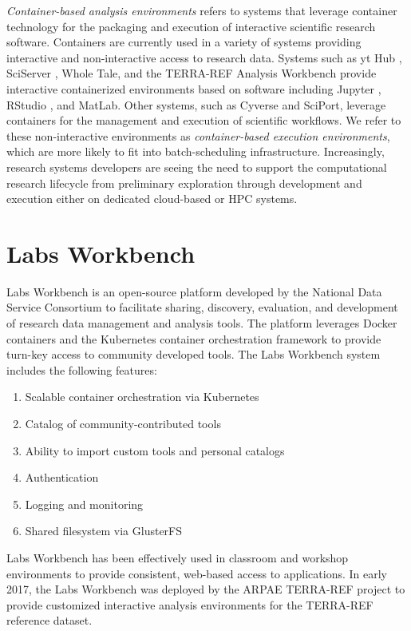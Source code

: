 \documentclass{sig-alternate}
\begin{document}
\emph{Container-based analysis environments} refers to systems that leverage container technology for the packaging and execution of interactive scientific research software. Containers are currently used in a variety of systems providing interactive and non-interactive access to research data. Systems such as yt Hub \cite{smith2011}, SciServer \cite{Medvedev:2016:SCB:2949689.2949700}, Whole Tale, and the TERRA-REF Analysis Workbench \cite{willis_craig_2017_580057} provide interactive containerized environments based on software including Jupyter \cite{kluyver2016jupyter}, RStudio \cite{Rstudio2015}, and MatLab. Other systems, such as Cyverse and SciPort\cite{Gerlach:2014:SCE:2689676.2689680}, leverage containers for the management and execution of scientific workflows. We refer to these non-interactive environments as \emph{container-based execution environments}, which are more likely to fit into batch-scheduling infrastructure.  Increasingly, research systems developers are seeing the need to support the computational research lifecycle from preliminary exploration through development and execution either on dedicated cloud-based or HPC systems.

\section{Labs Workbench}

Labs Workbench is an open-source platform developed by the National Data Service Consortium to facilitate sharing, discovery, evaluation, and development of research data management and analysis tools. The platform leverages Docker containers and the Kubernetes container orchestration framework to provide turn-key access to community developed tools. 
The Labs Workbench system includes the following features:
\begin{enumerate}
\itemsep-0.2em
\item Scalable container orchestration via Kubernetes
\item Catalog of community-contributed tools
\item Ability to import custom tools and personal catalogs
\item Authentication
\item Logging and monitoring
\item Shared filesystem via GlusterFS
\end{enumerate}

Labs Workbench has been effectively used in classroom and workshop environments to provide consistent, web-based access to applications. In early 2017, the Labs Workbench was deployed by the ARPAE TERRA-REF project to provide customized interactive analysis environments for the TERRA-REF reference dataset. 
\end{document}
